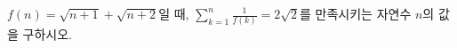 $f(n)=\sqrt{n+1}+\sqrt{n+2}$일 때, $\displaystyle\sum_{k=1}^{n}\frac{1}{f(k)}=2\sqrt{2}$를 만족시키는 자연수 $n$의 값을 구하시오.
